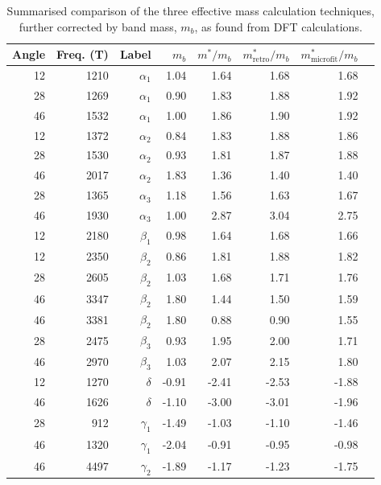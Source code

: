 \begin{table}
    \begin{center}
        \caption{Summarised comparison of the three effective mass calculation techniques, further corrected by band mass, $m_b$, as found from DFT calculations.}
        \begin{tabular}[!h]{rrrrrrrr}
\toprule
Angle	& Freq. (\unit{T})	& Label	 & $m_b$	& $m^*/m_b$	& $m^*_{\textrm{retro}}/m_b$	& $m^*_{\textrm{microfit}}/m_b$ \\
\midrule
12	& 1210	& $\alpha_1$	& 1.04	& 1.64	& 1.68 & 1.68	\\
28	& 1269	& $\alpha_1$	& 0.90	& 1.83	& 1.88 & 1.92	\\
46	& 1532	& $\alpha_1$	& 1.00	& 1.86	& 1.90 & 1.92	\\
12	& 1372	& $\alpha_2$	& 0.84	& 1.83	& 1.88 & 1.86	\\
28	& 1530	& $\alpha_2$	& 0.93	& 1.81	& 1.87 & 1.88	\\
46	& 2017	& $\alpha_2$	& 1.83	& 1.36	& 1.40 & 1.40	\\
28	& 1365	& $\alpha_3$	& 1.18	& 1.56	& 1.63 & 1.67	\\
46	& 1930	& $\alpha_3$	& 1.00	& 2.87	& 3.04 & 2.75	\\
12	& 2180	& $\beta_1$ 	& 0.98	& 1.64	& 1.68 & 1.66	\\
12	& 2350	& $\beta_2$ 	& 0.86	& 1.81	& 1.88 & 1.82	\\
28	& 2605	& $\beta_2$ 	& 1.03	& 1.68	& 1.71 & 1.76	\\
46	& 3347	& $\beta_2$ 	& 1.80	& 1.44	& 1.50 & 1.59	\\
46	& 3381	& $\beta_2$ 	& 1.80	& 0.88	& 0.90 & 1.55	\\
28	& 2475	& $\beta_3$ 	& 0.93	& 1.95	& 2.00 & 1.71	\\
46	& 2970	& $\beta_3$ 	& 1.03	& 2.07	& 2.15 & 1.80	\\
12	& 1270	& $\delta$  	& -0.91	& -2.41	& -2.53& -1.88	 \\
46	& 1626	& $\delta$  	& -1.10	& -3.00	& -3.01& -1.96	 \\
28	& 912	& $\gamma_1$	& -1.49	& -1.03	& -1.10& -1.46	 \\
46	& 1320	& $\gamma_1$	& -2.04	& -0.91	& -0.95& -0.98	 \\
46	& 4497	& $\gamma_2$	& -1.89	& -1.17	& -1.23& -1.75	 \\
\bottomrule
        \end{tabular}
        \label{Table:3:EffectiveMassResults}
    \end{center}
\end{table}
